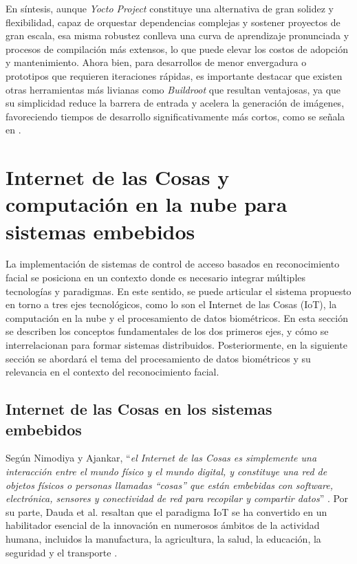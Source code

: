 En síntesis, aunque \textit{Yocto Project} constituye una alternativa de gran solidez y flexibilidad, capaz de orquestar dependencias complejas y sostener proyectos de gran escala, esa misma robustez conlleva una curva de aprendizaje pronunciada y procesos de compilación más extensos, lo que puede elevar los costos de adopción y mantenimiento. Ahora bien, para desarrollos de menor envergadura o prototipos que requieren iteraciones rápidas, es importante destacar que existen otras herramientas más livianas como \textit{Buildroot} que resultan ventajosas, ya que su simplicidad reduce la barrera de entrada y acelera la generación de imágenes, favoreciendo tiempos de desarrollo significativamente más cortos, como se señala en \cite{pera_2022}.

\section{Internet de las Cosas y computación en la nube para sistemas embebidos}
La implementación de sistemas de control de acceso basados en reconocimiento facial se posiciona en un contexto donde es necesario integrar múltiples tecnologías y paradigmas. En este sentido, se puede articular el sistema propuesto en torno a tres ejes tecnológicos, como lo son el Internet de las Cosas (IoT), la computación en la nube y el procesamiento de datos biométricos. En esta sección se describen los conceptos fundamentales de los dos primeros ejes, y cómo se interrelacionan para formar sistemas distribuidos. Posteriormente, en la siguiente sección se abordará el tema del procesamiento de datos biométricos y su relevancia en el contexto del reconocimiento facial.

\subsection{Internet de las Cosas en los sistemas embebidos}
Según Nimodiya y Ajankar, ``\textit{el Internet de las Cosas es simplemente una interacción entre el mundo físico y el mundo digital, y constituye una red de objetos físicos o personas llamadas ``cosas'' que están embebidas con software, electrónica, sensores y conectividad de red para recopilar y compartir datos}'' \cite{nimodiya_2022_IoTreview}. Por su parte, Dauda et al. resaltan que el paradigma IoT se ha convertido en un habilitador esencial de la innovación en numerosos ámbitos de la actividad humana, incluidos la manufactura, la agricultura, la salud, la educación, la seguridad y el transporte \cite{dauda_survey_2024}. 

